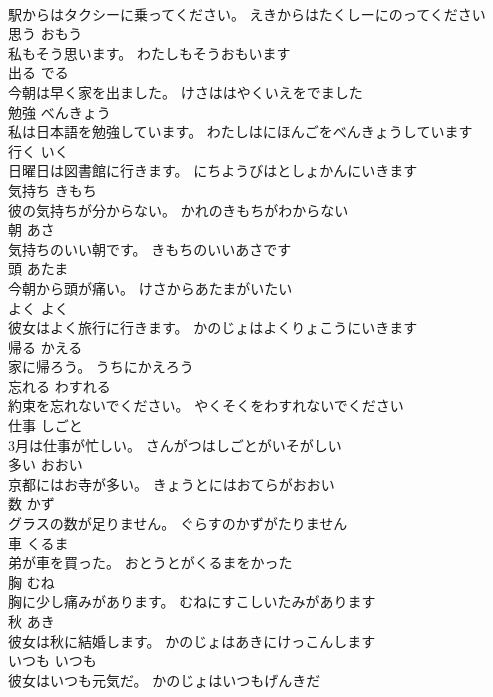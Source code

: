 \documentclass[8pt]{extreport}
\begin{document}
\begin{CJK}{UTF8}{min}
\\	駅からはタクシーに乗ってください。	えきからはたくしーにのってください	
\\	思う	おもう	
\\	私もそう思います。	わたしもそうおもいます	
\\	出る	でる	
\\	今朝は早く家を出ました。	けさははやくいえをでました	
\\	勉強	べんきょう	
\\	私は日本語を勉強しています。	わたしはにほんごをべんきょうしています	
\\	行く	いく	
\\	日曜日は図書館に行きます。	にちようびはとしょかんにいきます	
\\	気持ち	きもち	
\\	彼の気持ちが分からない。	かれのきもちがわからない	
\\	朝	あさ	
\\	気持ちのいい朝です。	きもちのいいあさです	
\\	頭	あたま	
\\	今朝から頭が痛い。	けさからあたまがいたい	
\\	よく	よく	
\\	彼女はよく旅行に行きます。	かのじょはよくりょこうにいきます	
\\	帰る	かえる	
\\	家に帰ろう。	うちにかえろう	
\\	忘れる	わすれる	
\\	約束を忘れないでください。	やくそくをわすれないでください	
\\	仕事	しごと	
\\	3月は仕事が忙しい。	さんがつはしごとがいそがしい	
\\	多い	おおい	
\\	京都にはお寺が多い。	きょうとにはおてらがおおい	
\\	数	かず	
\\	グラスの数が足りません。	ぐらすのかずがたりません	
\\	車	くるま	
\\	弟が車を買った。	おとうとがくるまをかった	
\\	胸	むね	
\\	胸に少し痛みがあります。	むねにすこしいたみがあります	
\\	秋	あき	
\\	彼女は秋に結婚します。	かのじょはあきにけっこんします	
\\	いつも	いつも	
\\	彼女はいつも元気だ。	かのじょはいつもげんきだ	

\end{CJK}
\end{document}
